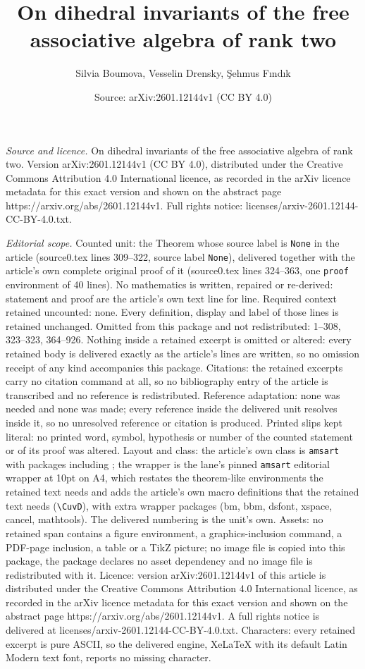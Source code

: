 \documentclass[10pt,a4paper]{amsart}
\title[On dihedral invariants of the free associative algebra of ra]{On dihedral invariants of the free associative algebra of rank two}
\author{Silvia Boumova, Vesselin Drensky, \c{S}ehmus F{\i}nd{\i}k}
\date{Source: arXiv:2601.12144v1 (CC BY 4.0)}
\begin{document}
\maketitle

\noindent\emph{Source and licence.} On dihedral invariants of the free associative algebra of rank two. Version arXiv:2601.12144v1 (CC BY 4.0), distributed under the Creative Commons Attribution 4.0 International licence, as recorded in the arXiv licence metadata for this exact version and shown on the abstract page https://arxiv.org/abs/2601.12144v1. Full rights notice: licenses/arxiv-2601.12144-CC-BY-4.0.txt.\par\smallskip

\noindent\textit{Editorial scope.} Counted unit: the Theorem whose source label is \texttt{None} in the article (source0.tex lines 309--322, source label \texttt{None}), delivered together with the article's own complete original proof of it (source0.tex lines 324--363, one \texttt{proof} environment of 40 lines). No mathematics is written, repaired or re-derived: statement and proof are the article's own text line for line. Required context retained uncounted: none. Every definition, display and label of those lines is retained unchanged. Omitted from this package and not redistributed: 1--308, 323--323, 364--926. Nothing inside a retained excerpt is omitted or altered: every retained body is delivered exactly as the article's lines are written, so no omission receipt of any kind accompanies this package. Citations: the retained excerpts carry no citation command at all, so no bibliography entry of the article is transcribed and no reference is redistributed. Reference adaptation: none was needed and none was made; every reference inside the delivered unit resolves inside it, so no unresolved reference or citation is produced. Printed slips kept literal: no printed word, symbol, hypothesis or number of the counted statement or of its proof was altered. Layout and class: the article's own class is \texttt{amsart} with packages including ; the wrapper is the lane's pinned \texttt{amsart} editorial wrapper at 10pt on A4, which restates the theorem-like environments the retained text needs and adds the article's own macro definitions that the retained text needs (\texttt{\textbackslash CuvD}), with extra wrapper packages (bm, bbm, dsfont, xspace, cancel, mathtools). The delivered numbering is the unit's own. Assets: no retained span contains a figure environment, a graphics-inclusion command, a PDF-page inclusion, a table or a TikZ picture; no image file is copied into this package, the package declares no asset dependency and no image file is redistributed with it. Licence: version arXiv:2601.12144v1 of this article is distributed under the Creative Commons Attribution 4.0 International licence, as recorded in the arXiv licence metadata for this exact version and shown on the abstract page https://arxiv.org/abs/2601.12144v1. A full rights notice is delivered at licenses/arxiv-2601.12144-CC-BY-4.0.txt. Characters: every retained excerpt is pure ASCII, so the delivered engine, XeLaTeX with its default Latin Modern text font, reports no missing character.
\end{document}
